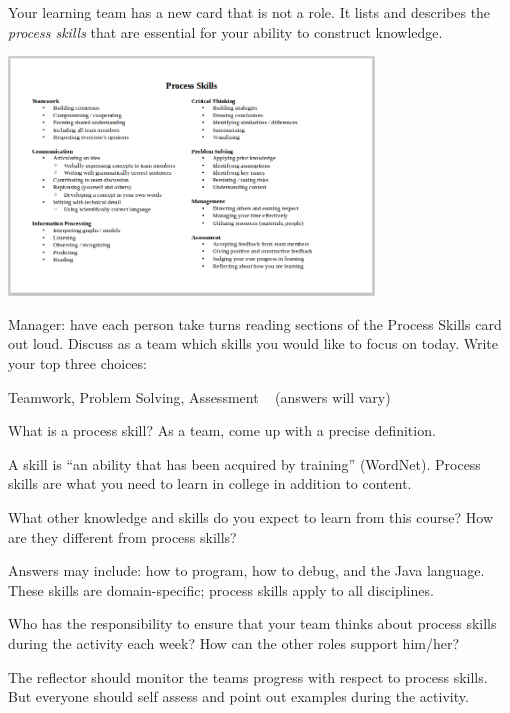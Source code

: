 
Your learning team has a new card that is not a role.
It lists and describes the \emph{process skills} that are essential for your ability to construct knowledge.

\begin{center}
\includegraphics[height=2.5in]{Meta/skills1.png}
\end{center}



\Q Manager: have each person take turns reading sections of the Process Skills card out loud. Discuss as a team which skills you would like to focus on today. Write your top three choices:

\begin{answer}
Teamwork, Problem Solving, Assessment ~ (answers will vary)
\end{answer}


\Q What is a process skill? As a team, come up with a precise definition.

\begin{answer}
A skill is ``an ability that has been acquired by training'' (WordNet).
Process skills are what you need to learn in college in addition to content.
\end{answer}


\Q What other knowledge and skills do you expect to learn from this course?
How are they different from process skills?

\begin{answer}
Answers may include: how to program, how to debug, and the Java language.
These skills are domain-specific; process skills apply to all disciplines.
\end{answer}


\Q Who has the responsibility to ensure that your team thinks about process skills during the activity each week?
How can the other roles support him/her?

\begin{answer}
The reflector should monitor the teams progress with respect to process skills.
But everyone should self assess and point out examples during the activity.
\end{answer}
